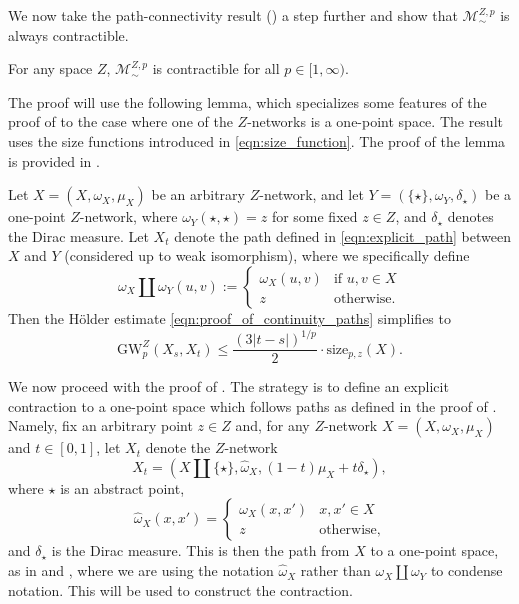 \documentclass[twoside,11pt]{article}
\theoremstyle{definition}
\newcommand{\M}{\mathcal{M}}
\newcommand{\MZp}{\M_{\sim}^{Z,p}}
\newcommand{\dgwz}{\mathrm{GW}_p^Z}
\begin{document}
We now take the path-connectivity result () a step further and show that $\MZp$ is always contractible. 

\begin{theorem}
    \label{thm:contractible}
    For any space $Z$, $\MZp$ is contractible for all $p \in [1,\infty)$.
\end{theorem}

The proof will use the following lemma, which specializes some features of the proof of  to the case where one of the $Z$-networks is a one-point space. The result uses the size functions introduced in \eqref{eqn:size_function}. The proof of the lemma is provided in .

\begin{lemma}\label{lem:one_point_Holder}
    Let $X = (X,\omega_X,\mu_X)$ be an arbitrary $Z$-network, and let $Y = (\{\star\},\omega_Y,\delta_\star)$ be a one-point $Z$-network, where $\omega_Y(\star,\star) = z$ for some fixed $z \in Z$, and $\delta_\star$ denotes the Dirac measure. Let $X_t$ denote the path defined in \eqref{eqn:explicit_path} between $X$ and $Y$ (considered up to weak isomorphism), where we specifically define 
    \[
    \omega_X \amalg \omega_Y(u,v) := \left\{\begin{array}{lr}
    \omega_X(u,v) & \mbox{if } u,v \in X \\
    z & \mbox{otherwise.}
    \end{array}\right.
    \]
    Then the H\"{o}lder estimate \eqref{eqn:proof_of_continuity_paths} simplifies to
    \begin{equation}\label{eqn:Holder_estimate_one_point}
    \dgwz(X_s,X_t) \leq \frac{(3 |t-s|)^{1/p}}{2} \cdot \mathrm{size}_{p,z}(X).
    \end{equation}
\end{lemma}



We now proceed with the proof of . The strategy is to define an explicit contraction to a one-point space which follows paths as defined in the proof of . Namely, fix an arbitrary point $z \in Z$ and, for any $Z$-network $X = (X,\omega_X,\mu_X)$ and $t \in [0,1]$, let $X_t$ denote the $Z$-network 
 \begin{equation}\label{eqn:contractible}
 X_t = (X \amalg \{\star\}, \hat{\omega}_X, (1-t) \mu_X + t \delta_\star),
 \end{equation}
 where $\star$ is an abstract point, 
 \[
 \hat{\omega}_X(x,x') = \left\{\begin{array}{lr}
 \omega_X(x,x') & x,x' \in X \\
 z & \mbox{otherwise,}\end{array}\right.
 \]
 and $\delta_\star$ is the Dirac measure. This is then the path from $X$ to a one-point space, as in  and , where we are using the notation $\hat{\omega}_X$ rather than $\omega_X \amalg \omega_Y$ to condense notation. This will be used to construct the contraction. 
\end{document}

